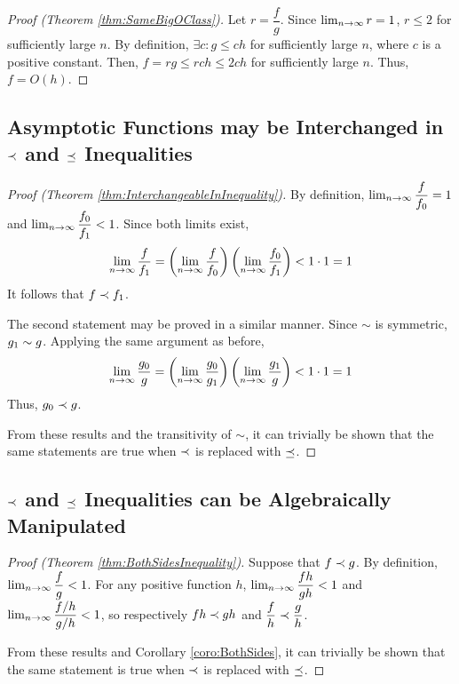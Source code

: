 \begin{proof}[Proof (Theorem \ref{thm:SameBigOClass})]
	Let $r = \dfrac{f}{g}$. Since $\lim_{n \to \infty} r = 1$, $r \leq 2$ for sufficiently large $n$. By definition, $\exists c : g \leq c h$ for sufficiently large $n$, where $c$ is a positive constant. Then, $f = rg \leq rc h \leq 2c h$ for sufficiently large $n$. Thus, $f = O(h)$.
\end{proof}

\subsection{Asymptotic Functions may be Interchanged in $\prec$ and $\preceq$ Inequalities}

\begin{proof}[Proof (Theorem \ref{thm:InterchangeableInInequality})]
	By definition, $\lim_{n \to \infty} \dfrac{f}{f_0} = 1$ and $\lim_{n \to \infty} \dfrac{f_0}{f_1} < 1$. Since both limits exist,
	\begin{align*}
	\lim_{n \to \infty} \frac{f}{f_1} = \left( \lim_{n \to \infty} \frac{f}{f_0} \right) \left( \lim_{n \to \infty} \frac{f_0}{f_1} \right) < 1 \cdot 1 = 1
	\end{align*}
	It follows that $f \prec f_1$.
	
	The second statement may be proved in a similar manner. Since $\sim$ is symmetric, $g_1 \sim g$. Applying the same argument as before,
	\begin{align*}
	\lim_{n \to \infty} \frac{g_0}{g} = \left( \lim_{n \to \infty} \frac{g_0}{g_1} \right) \left( \lim_{n \to \infty} \frac{g_1}{g} \right) < 1 \cdot 1 = 1
	\end{align*}
	Thus, $g_0 \prec g$.
	
	From these results and the transitivity of $\sim$, it can trivially be shown that the same statements are true when $\prec$ is replaced with $\preceq$.
\end{proof}

\subsection{$\prec$ and $\preceq$ Inequalities can be Algebraically Manipulated}

\begin{proof}[Proof (Theorem \ref{thm:BothSidesInequality})]
	Suppose that $f \prec g$. By definition, $\lim_{n \to \infty} \dfrac{f}{g} < 1$. For any positive function $h$, $\lim_{n \to \infty} \dfrac{fh}{gh} < 1$ and $\lim_{n \to \infty} \dfrac{f / h}{g / h} < 1$, so respectively $fh \prec gh$ and $\dfrac{f}{h} \prec \dfrac{g}{h}$.
	
	From these results and Corollary \ref{coro:BothSides}, it can trivially be shown that the same statement is true when $\prec$ is replaced with $\preceq$.
\end{proof}

